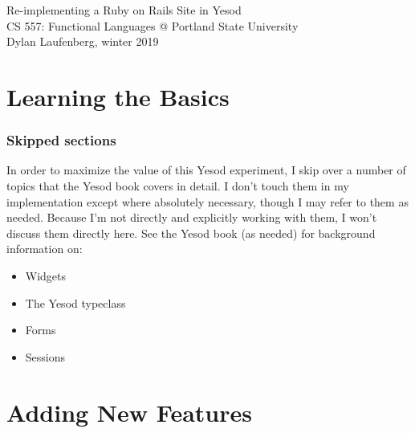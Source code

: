 \documentclass{article}
\begin{document}
\begin{center}
    \Huge Re-implementing a Ruby on Rails Site in Yesod \\
    \large CS 557: Functional Languages @ Portland State University \\
    Dylan Laufenberg, winter 2019
\end{center}



\part{Learning the Basics}





\section{Skipped sections}

In order to maximize the value of this Yesod experiment, I skip over a number of topics that the Yesod book covers in detail. I don't touch them in my implementation except where absolutely necessary, though I may refer to them as needed. Because I'm not directly and explicitly working with them, I won't discuss them directly here. See the Yesod book (as needed) for background information on:

\begin{itemize}
  \item Widgets
  \item The Yesod typeclass
  \item Forms
  \item Sessions
\end{itemize}

\part{Adding New Features}











\newpage
\printbibliography
\end{document}
